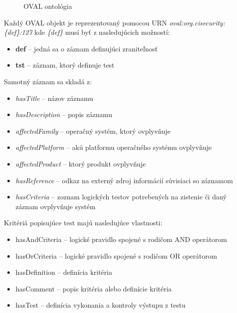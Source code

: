 \documentclass[12pt, a4paper, oneside]{book}
\begin{document}
\begin{figure}
\label{fig:semantic_web}
\caption{OVAL ontológia}
\end{figure}


Každý OVAL objekt je reprezentovaný pomocou URN \textit{oval:org.cisecurity:\{def\}:127} kde \textit{\{def\}} musí byť z nasledujúcich možností:
\begin{itemize}
\item \textbf{def} -- jedná sa o záznam definujúci zraniteľnosť
\item \textbf{tst} -- záznam, ktorý definuje test
\end{itemize}
Samotný záznam sa skladá z:
\begin{itemize}
\item \textit{hasTitle} -- názov záznamu
\item \textit{hasDescription} -- popis záznamu
\item \textit{affectedFamily} -- operačný systém, ktorý ovplyvňuje
\item \textit{affectedPlatform} -- akú platformu operačného systému ovplyvňuje
\item \textit{affectedProduct} -- ktorý produkt ovplyvňuje
\item \textit{hasReference} -- odkaz na externý zdroj informácií súvisiaci so záznamom
\item \textit{hasCriteria} -- zoznam logických testov potrebených na zistenie či daný záznam ovplyvňuje systém
\end{itemize}


Kritériá popisujúce test majú nasledujúce vlastnosti:
\begin{itemize}
\item hasAndCriteria -- logické pravidlo spojené s rodičom AND operátorom
\item hasOrCriteria -- logické pravidlo spojené s rodičom OR operátorom
\item hasDefinition -- definícia kritéria
\item hasComment -- popis kritéria alebo definície kritéria
\item hasTest -- definícia vykonania a kontroly výstupu z testu
\end{itemize}
\end{document}

